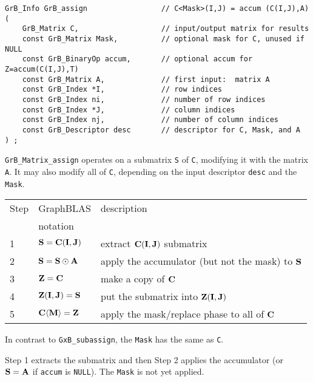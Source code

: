 \documentclass[12pt]{article}
\begin{document}
{\begin{mdframed}[userdefinedwidth=6in]
{\footnotesize
\begin{verbatim}
GrB_Info GrB_assign                 // C<Mask>(I,J) = accum (C(I,J),A)
(
    GrB_Matrix C,                   // input/output matrix for results
    const GrB_Matrix Mask,          // optional mask for C, unused if NULL
    const GrB_BinaryOp accum,       // optional accum for Z=accum(C(I,J),T)
    const GrB_Matrix A,             // first input:  matrix A
    const GrB_Index *I,             // row indices
    const GrB_Index ni,             // number of row indices
    const GrB_Index *J,             // column indices
    const GrB_Index nj,             // number of column indices
    const GrB_Descriptor desc       // descriptor for C, Mask, and A
) ;
\end{verbatim} } \end{mdframed}

\verb'GrB_Matrix_assign' operates on a submatrix \verb'S' of \verb'C',
modifying it with the matrix \verb'A'.  It may also modify all of \verb'C',
depending on the input descriptor \verb'desc' and the \verb'Mask'.

\vspace{0.1in}
\begin{tabular}{lll}
\hline
Step & GraphBLAS & description \\
     & notation  & \\
\hline
1 & ${\bf S} = {\bf C(I,J)}$                & extract ${\bf C(I,J)}$ submatrix \\
2 & ${\bf S} = {\bf S} \odot {\bf A}$       & apply the accumulator (but not the mask) to ${\bf S}$\\
3 & ${\bf Z} = {\bf C}$                     & make a copy of ${\bf C}$ \\
4 & ${\bf Z(I,J)} = {\bf S}$                & put the submatrix into ${\bf Z(I,J)}$ \\
5 & ${\bf C \langle M \rangle = Z}$         & apply the mask/replace phase to all of ${\bf C}$ \\
\hline
\end{tabular}
\vspace{0.1in}

In contrast to \verb'GxB_subassign', the \verb'Mask' has the same as \verb'C'.

Step 1 extracts the submatrix and then Step 2 applies the accumulator
(or ${\bf S}={\bf A}$ if \verb'accum' is \verb'NULL').  The \verb'Mask' is
not yet applied.

}
\end{document}
